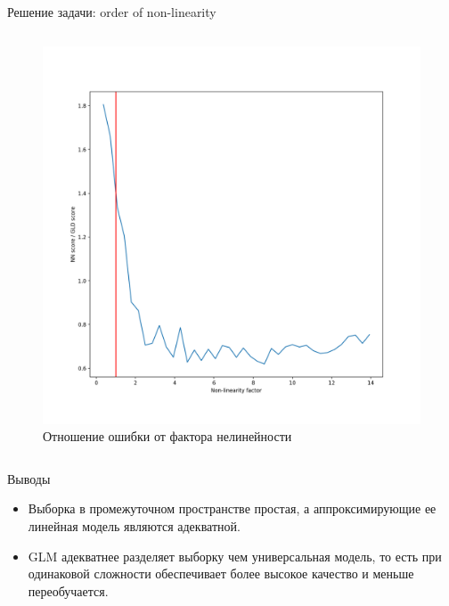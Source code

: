 \documentclass{beamer}
\begin{document}
\begin{frame}{Решение задачи: order of non-linearity}
\begin{columns}
\begin{column}{.5\textwidth}
\begin{figure}[ht]
                  \includegraphics[width=\textwidth]{../pics/loss_and_std_of_nl_factor.png}
                  \caption{Отношение ошибки от фактора нелинейности}
            \end{figure}
        \end{column}%
    \end{columns}

\end{frame}
\begin{frame}{Выводы}
    \begin{itemize}
        \item Выборка в промежуточном пространстве простая,
        а аппроксимирующие ее линейная модель являются адекватной.
        \item GLM адекватнее разделяет выборку чем универсальная модель, то есть
        при одинаковой сложности обеспечивает более высокое качество и меньше переобучается.
    \end{itemize}
\end{frame}

\end{document}

